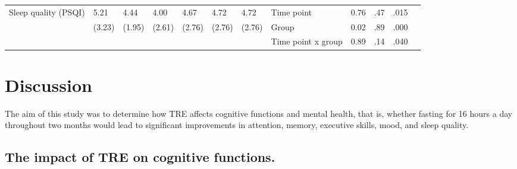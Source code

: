 \documentclass[authordate, empirical]{jote-new-article}
\begin{document}
\begin{table}[th!]
\begin{fullwidth}
{\begin{tabular}{@{} l l l l l l l | l l l l l @{}}
        \hline        Sleep quality (PSQI)             & 5.21                                          & 4.44                 & 4.00                 & 4.67          & 4.72                                  & 4.72   & Time point         & 0.76 & .47  & .015 \\
                                                       & (3.23)                                        & (1.95)               & (2.61)               & (2.76)        & (2.76)                                & (2.76) & Group              & 0.02 & .89  & .000 \\
                                                       &                                               &                      &                      &               &                                       &        & Time point x group & 0.89 & .14  & .040 \\
        \bottomrule
      \end{tabular}}
  \end{fullwidth}
\end{table}





\section{Discussion }



The aim of this study was to determine how TRE affects cognitive functions and mental health, that is, whether fasting for 16 hours a day throughout two months would lead to significant improvements in attention, memory, executive skills, mood, and sleep quality.



\subsection{The impact of TRE on cognitive functions.}
\end{document}
